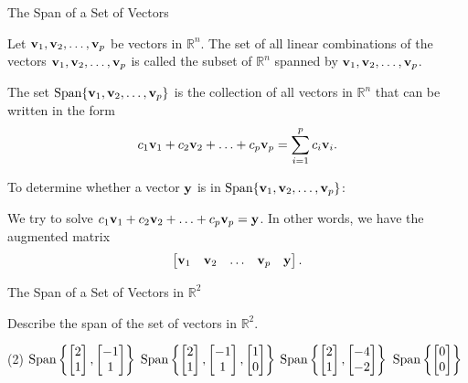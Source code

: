 \documentclass[xcolor=dvipsnames,aspectratio=169,t]{beamer}
\begin{document}
\begin{frame}{The Span of a Set of Vectors}

  \bbox
  Let $\mathbf{v}_1, \mathbf{v}_2, \ldots , \mathbf{v}_p$ be vectors in $\mathbb{R}^n$. The set of all linear combinations of the vectors $\mathbf{v}_1, \mathbf{v}_2, \ldots , \mathbf{v}_p$ is called the \alert{subset of $\mathbb{R}^n$ spanned by $\mathbf{v}_1, \mathbf{v}_2, \ldots , \mathbf{v}_p$}.

  The set \alert{$\mbox{Span}\lbrace \mathbf{v}_1, \mathbf{v}_2, \ldots , \mathbf{v}_p \rbrace$} is the collection of all vectors in $\mathbb{R}^n$ that can be written in the form
\[  c_1 \mathbf{v}_1 + c_2 \mathbf{v}_2 + \ldots + c_p \mathbf{v}_p = \sum_{i=1}^p c_i \mathbf{v}_i. \]
\ebox

  \pause
  To determine whether a vector $\mathbf{y}$ is in $\mbox{Span}\lbrace \mathbf{v}_1, \mathbf{v}_2, \ldots , \mathbf{v}_p \rbrace$: 

  \bi
  \ii We try to  solve $c_1 \mathbf{v}_1 + c_2 \mathbf{v}_2 + \ldots + c_p \mathbf{v}_p = \mathbf{y}$.
  \ii In other words, we have the augmented matrix 
  \[ \begin{bmatrix} \mathbf{v}_1 & \mathbf{v}_2 & \ldots & \mathbf{v}_p & \mathbf{y} \end{bmatrix} . \] 
  \ei
\end{frame}

\begin{frame}{The Span of a Set of Vectors in $\mathbb{R}^2$}

Describe the span of the set of vectors in $\mathbb{R}^2$.
\bigskip
  
  \begin{tasks}(2)
      \task $\displaystyle \mbox{Span} \left\{ \begin{bmatrix} 2 \\ 1 \end{bmatrix} , \begin{bmatrix} -1 \\ 1 \end{bmatrix} \right\}$  
 \task $\displaystyle \mbox{Span} \left\{ \begin{bmatrix} 2 \\ 1 \end{bmatrix} , \begin{bmatrix} -1 \\ 1 \end{bmatrix},  \begin{bmatrix} 1 \\ 0 \end{bmatrix} \right\}$  \vspace{0.75in}
 \task $\displaystyle \mbox{Span} \left\{ \begin{bmatrix} 2 \\ 1 \end{bmatrix} , \begin{bmatrix} -4 \\ -2 \end{bmatrix} \right\}$  
\task $\displaystyle \mbox{Span} \left\{ \begin{bmatrix} 0 \\ 0 \end{bmatrix} \right\}$  
\end{tasks}

 \vspace{1.5in}
  
\end{frame}
\end{document}
